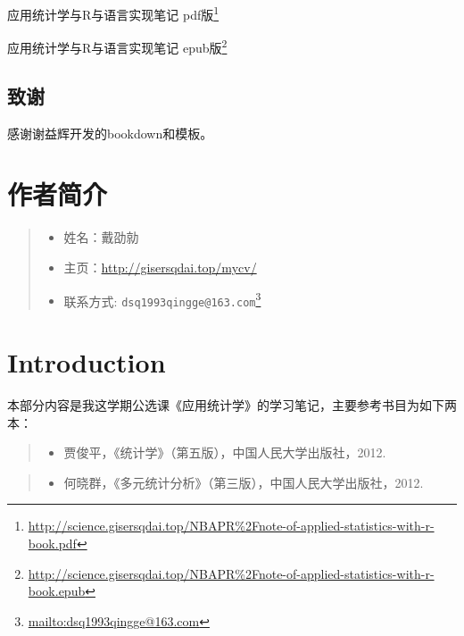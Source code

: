 \documentclass[]{ctexbook}
\providecommand{\tightlist}{%
  \setlength{\itemsep}{0pt}\setlength{\parskip}{0pt}}
\renewcommand{\href}[2]{#2\footnote{\url{#1}}}
\begin{document}
\href{http://science.gisersqdai.top/NBAPR\%2Fnote-of-applied-statistics-with-r-book.pdf}{应用统计学与R与语言实现笔记 pdf版}

\href{http://science.gisersqdai.top/NBAPR\%2Fnote-of-applied-statistics-with-r-book.epub}{应用统计学与R与语言实现笔记 epub版}

\hypertarget{ux81f4ux8c22}{%
\section*{致谢}\label{ux81f4ux8c22}}


感谢谢益辉开发的bookdown和模板。

\hypertarget{author}{%
\chapter*{作者简介}\label{author}}


\begin{quote}
\begin{itemize}
\tightlist
\item
  姓名：戴劭勍
\item
  主页：\url{http://gisersqdai.top/mycv/}
\item
  联系方式: \href{mailto:dsq1993qingge@163.com}{\nolinkurl{dsq1993qingge@163.com}}
\end{itemize}
\end{quote}

\mainmatter

\hypertarget{intro}{%
\chapter{Introduction}\label{intro}}

本部分内容是我这学期公选课《应用统计学》的学习笔记，主要参考书目为如下两本：

\begin{quote}
\begin{itemize}
\tightlist
\item
  贾俊平，《统计学》（第五版），中国人民大学出版社，2012.
\end{itemize}
\end{quote}

\begin{quote}
\begin{itemize}
\tightlist
\item
  何晓群，《多元统计分析》（第三版），中国人民大学出版社，2012.
\end{itemize}
\end{quote}
\end{document}
